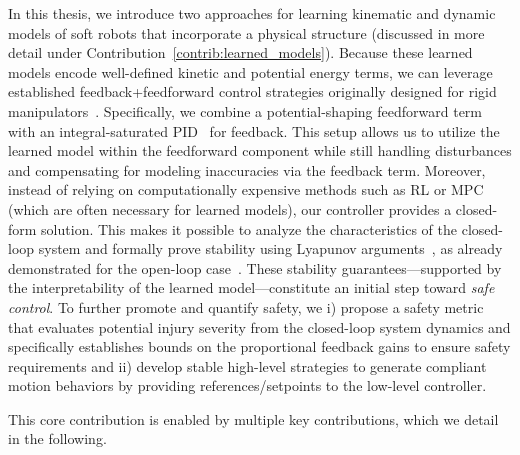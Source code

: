 In this thesis, we introduce two approaches for learning kinematic and dynamic models of soft robots that incorporate a physical structure (discussed in more detail under Contribution~\ref{contrib:learned_models}). Because these learned models encode well-defined kinetic and potential energy terms, we can leverage established feedback+feedforward control strategies originally designed for rigid manipulators~\cite{kelly1995tuning, kelly1996class, kelly1998global, sciavicco2012modelling}. Specifically, we combine a potential-shaping feedforward term~\cite{della2023model} with an integral-saturated PID~\cite{pustina2022p} for feedback. This setup allows us to utilize the learned model within the feedforward component while still handling disturbances and compensating for modeling inaccuracies via the feedback term.
% 
Moreover, instead of relying on computationally expensive methods such as \gls{RL} or \gls{MPC} (which are often necessary for learned models), our controller provides a closed-form solution. This makes it possible to analyze the characteristics of the closed-loop system and formally prove stability using Lyapunov arguments~\cite{khalil2002nonlinear}, as already demonstrated for the open-loop case~\cite{stolzle2024input}. These stability guarantees—supported by the interpretability of the learned model—constitute an initial step toward \emph{safe control}.
% 
To further promote and quantify safety, we i) propose a safety metric that evaluates potential injury severity from the closed-loop system dynamics and specifically establishes bounds on the proportional feedback gains to ensure safety requirements and ii) develop stable high-level strategies to generate compliant motion behaviors by providing references/setpoints to the low-level controller.

This core contribution is enabled by multiple key contributions, which we detail in the following.

